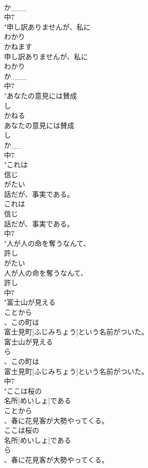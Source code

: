 \documentclass[8pt]{extreport}
\begin{document}
\begin{CJK}{UTF8}{min}
\\	か___
\\	中7
\\	"申し訳ありませんが、私に
\\	わかり
\\	かねます
\\	申し訳ありませんが、私に
\\	わかり
\\	か___
\\	中7
\\	"あなたの意見には賛成
\\	し
\\	かねる
\\	あなたの意見には賛成
\\	し
\\	か__
\\	中7
\\	"これは
\\	信じ
\\	がたい
\\	話だが、事実である。
\\	これは
\\	信じ
\\	話だが、事実である。
\\	中7
\\	"人が人の命を奪うなんて、
\\	許し
\\	がたい
\\	人が人の命を奪うなんて、
\\	許し
\\	中7
\\	"富士山が見える
\\	ことから
\\	、この町は
\\	富士見町[ふじみちょう]という名前がついた。
\\	富士山が見える
\\	ら
\\	、この町は
\\	富士見町[ふじみちょう]という名前がついた。
\\	中7
\\	"ここは桜の
\\	名所[めいしょ]である
\\	ことから
\\	、春に花見客が大勢やってくる。
\\	ここは桜の
\\	名所[めいしょ]である
\\	ら
\\	、春に花見客が大勢やってくる。

\end{CJK}
\end{document}
